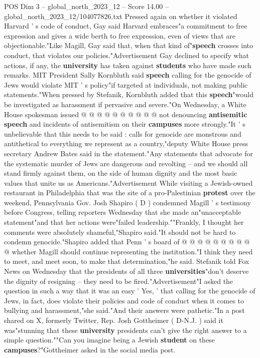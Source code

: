 \begin{textsample}{POS Dim 3 – global\_north\_2023\_12 – Score 14.00 – global\_north\_2023\_12/104077826.txt}
Pressed again on whether it violated Harvard ' s code of conduct, Gay said Harvard embraces"a commitment to free expression and gives a wide berth to free expression, even of views that are objectionable."Like Magill, Gay said that, when that kind of"\textbf{speech} crosses into conduct, that violates our policies."Advertisement Gay declined to specify what actions, if any, the \textbf{university} has taken against \textbf{students} who have made such remarks.
MIT President Sally Kornbluth said \textbf{speech} calling for the genocide of Jews would violate MIT ' s policy"if targeted at individuals, not making public statements."When pressed by Stefanik, Kornbluth added that this \textbf{speech}"would be investigated as harassment if pervasive and severe."On Wednesday, a White House spokesman issued @ @ @ @ @ @ @ @ @ @ not denouncing \textbf{antisemitic} \textbf{speech} and incidents of antisemitism on their \textbf{campuses} more strongly."It ' s unbelievable that this needs to be said : calls for genocide are monstrous and antithetical to everything we represent as a country,"deputy White House press secretary Andrew Bates said in the statement."Any statements that advocate for the systematic murder of Jews are dangerous and revolting -- and we should all stand firmly against them, on the side of human dignity and the most basic values that unite us as Americans."Advertisement While visiting a Jewish-owned restaurant in Philadelphia that was the site of a pro-Palestinian \textbf{protest} over the weekend, Pennsylvania Gov.
Josh Shapiro ( D ) condemned Magill ' s testimony before Congress, telling reporters Wednesday that she made an"unacceptable statement"and that her actions were"failed leadership.""Frankly, I thought her comments were absolutely shameful,"Shapiro said."It should not be hard to condemn genocide."Shapiro added that Penn ' s board of @ @ @ @ @ @ @ @ @ @ whether Magill should continue representing the institution."I think they need to meet, and meet soon, to make that determination,"he said.
Stefanik told Fox News on Wednesday that the presidents of all three \textbf{universities}"don't deserve the dignity of resigning -- they need to be fired."Advertisement"I asked the question in such a way that it was an easy ' Yes, ' that calling for the genocide of Jews, in fact, does violate their policies and code of conduct when it comes to bullying and harassment,"she said."And their answers were pathetic."In a post shared on X, formerly Twitter, Rep.
Josh Gottheimer ( D-N.J. ) said it was"stunning that these \textbf{university} presidents can't give the right answer to a simple question.""Can you imagine being a Jewish \textbf{student} on these \textbf{campuses}?"Gottheimer asked in the social media post.

\end{textsample}
